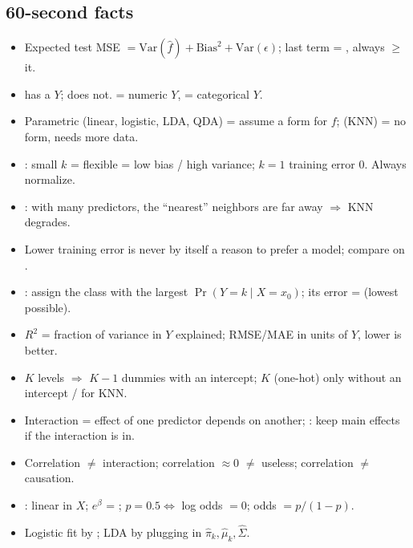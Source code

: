 \subsection{60-second facts}
\begin{keybox}
\begin{itemize}[leftmargin=1em,itemsep=0pt]
\item Expected test MSE $=\mathrm{Var}(\hat f)+\mathrm{Bias}^2+\mathrm{Var}(\epsilon)$; last term = , always $\ge$ it.
\item {} has a $Y$;  does not.  = numeric $Y$,  = categorical $Y$.
\item Parametric (linear, logistic, LDA, QDA) = assume a form for $f$;  (KNN) = no form, needs more data.
\item {}: small $k$ = flexible = low bias / high variance; $k=1$ training error 0. Always normalize.
\item {}: with many predictors, the ``nearest'' neighbors are far away $\Rightarrow$ KNN degrades.
\item Lower training error is never by itself a reason to prefer a model; compare on .
\item {}: assign the class with the largest $\Pr(Y=k\mid X=x_0)$; its error =  (lowest possible).
\item $R^2$ = fraction of variance in $Y$ explained; RMSE/MAE in units of $Y$, lower is better.
\item $K$ levels $\Rightarrow$ $K-1$ dummies with an intercept; $K$ (one-hot) only without an intercept / for KNN.
\item Interaction = effect of one predictor depends on another; : keep main effects if the interaction is in.
\item Correlation $\ne$ interaction; correlation $\approx 0$ $\ne$ useless; correlation $\ne$ causation.
\item {}:  linear in $X$; $e^{\beta}$ = ; $p=0.5\Leftrightarrow$ log odds $=0$; odds $=p/(1-p)$.
\item Logistic fit by ; LDA by plugging in $\hat\pi_k,\hat\mu_k,\hat\Sigma$.

\end{itemize}
\end{keybox}
